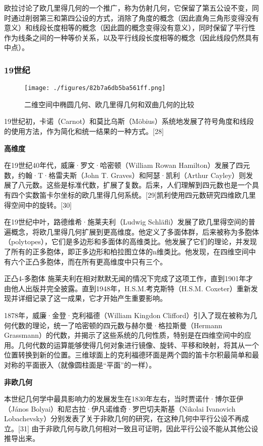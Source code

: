 欧拉讨论了欧几里得几何的一个推广，称为仿射几何，它保留了第五公设不变，同时通过削弱第三和第四公设的方式，消除了角度的概念（因此直角三角形变得没有意义）和线段长度相等的概念（因此圆的概念变得没有意义），同时保留了平行性作为线条之间的一种等价关系，以及平行线段长度相等的概念（因此线段仍然具有中点）。
\subsubsection{19世纪}
\begin{figure}[ht]
\centering
\texttt{[image: ./figures/82b7a6db5ba561ff.png]}
\caption{二维空间中椭圆几何、欧几里得几何和双曲几何的比较} \label{fig_OJLJH_26}
\end{figure}
19世纪初，卡诺（Carnot）和莫比乌斯（Möbius）系统地发展了符号角度和线段的使用方法，作为简化和统一结果的一种方式。[28]

\textbf{高维度}

在19世纪40年代，威廉·罗文·哈密顿（William Rowan Hamilton）发展了四元数，约翰·T·格雷夫斯（John T. Graves）和阿瑟·凯利（Arthur Cayley）则发展了八元数。这些是标准代数，扩展了复数。后来，人们理解到四元数也是一个具有四个实数笛卡尔坐标的欧几里得几何系统。[29]凯利使用四元数研究四维欧几里得空间中的旋转。[30]

在19世纪中叶，路德维希·施莱夫利（Ludwig Schläfli）发展了欧几里得空间的普遍概念，将欧几里得几何扩展到更高维度。他定义了多面体群，后来被称为多胞体（polytopes），它们是多边形和多面体的高维类比。他发展了它们的理论，并发现了所有的正多胞体，即正多边形和柏拉图立体的n维类比。他发现，在四维空间中有六个正凸多胞体，而在所有更高维度中只有三个。

正凸4-多胞体
施莱夫利在相对默默无闻的情况下完成了这项工作，直到1901年才由他人出版并完全披露。直到1948年，H.S.M.考克斯特（H.S.M. Coxeter）重新发现并详细记录了这一成果，它才开始产生重要影响。

1878年，威廉·金登·克利福德（William Kingdon Clifford）引入了现在被称为几何代数的理论，统一了哈密顿的四元数与赫尔曼·格拉斯曼（Hermann Grassmann）的代数，并揭示了这些系统的几何性质，特别是在四维空间中的应用。几何代数的运算能够使得几何对象进行镜像、旋转、平移和映射，将其从一个位置转换到新的位置。三维球面上的克利福德环面是两个圆的笛卡尔积最简单和最对称的平面嵌入（就像圆柱面是“平面”的一样）。

\textbf{非欧几何}

本世纪几何学中最具影响力的发展发生在1830年左右，当时贾诺什·博尔亚伊（János Bolyai）和尼古拉·伊凡诺维奇·罗巴切夫斯基（Nikolai Ivanovich Lobachevsky）分别发表了关于非欧几何的研究，在这种几何中平行公设不再成立。[31] 由于非欧几何与欧几何相对一致且可证明，因此平行公设不能从其他公设推导出来。

